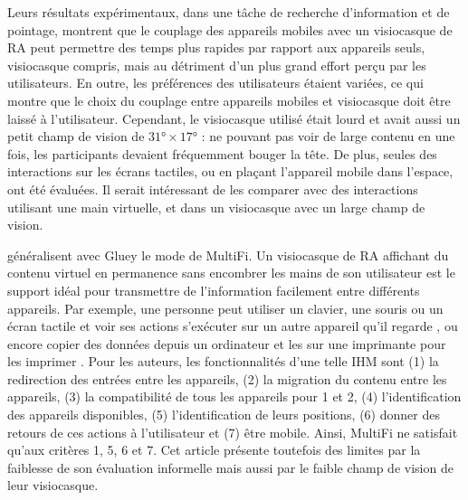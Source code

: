 Leurs résultats expérimentaux, dans une tâche de recherche d'information et de pointage, montrent que le couplage des appareils mobiles avec un visiocasque de RA peut permettre des temps plus rapides par rapport aux appareils seuls, visiocasque compris, mais au détriment d'un plus grand effort perçu par les utilisateurs. En outre, les préférences des utilisateurs étaient variées, ce qui montre que le choix du couplage entre appareils mobiles et visiocasque doit être laissé à l'utilisateur. Cependant, le visiocasque utilisé était lourd et avait aussi un petit champ de vision de $\ang{31} \times \ang{17}$ : ne pouvant pas voir de large contenu en une fois, les participants devaient fréquemment bouger la tête. De plus, seules des interactions sur les écrans tactiles, ou en plaçant l'appareil mobile dans l'espace, ont été évaluées. Il serait intéressant de les comparer avec des interactions utilisant une main virtuelle, et dans un visiocasque avec un large champ de vision.


\cite{Serrano2015} généralisent avec Gluey le mode  de MultiFi. Un visiocasque de RA affichant du contenu virtuel en permanence sans encombrer les mains de son utilisateur est le support idéal pour transmettre de l'information facilement entre différents appareils. Par exemple, une personne peut utiliser un clavier, une souris ou un écran tactile et voir ses actions s'exécuter sur un autre appareil qu'il regarde , ou encore copier des données depuis un ordinateur et les  sur une imprimante pour les imprimer . Pour les auteurs, les fonctionnalités d'une telle IHM sont (1) la redirection des entrées entre les appareils, (2) la migration du contenu entre les appareils, (3) la compatibilité de tous les appareils pour 1 et 2, (4) l'identification des appareils disponibles, (5) l'identification de leurs positions, (6) donner des retours de ces actions à l'utilisateur et (7) être mobile. Ainsi, MultiFi ne satisfait qu'aux critères 1, 5, 6 et 7. Cet article présente toutefois des limites par la faiblesse de son évaluation informelle mais aussi par le faible champ de vision de leur visiocasque.

